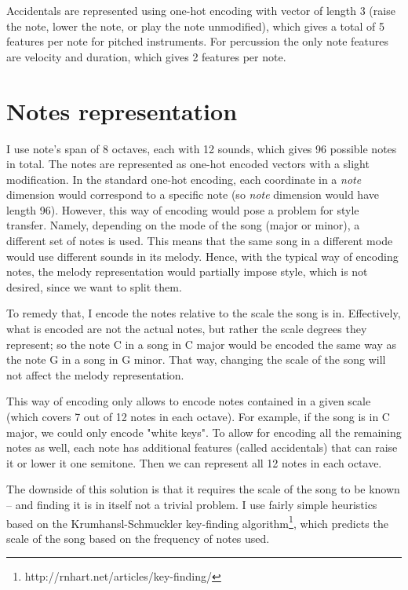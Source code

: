 \documentclass[en]{pracamgr}
\begin{document}
Accidentals are represented using one-hot encoding with vector of length 3 (raise the note, lower the note, or play the note unmodified), which gives a total of 5 features per note for pitched instruments.
For percussion the only note features are velocity and duration, which gives 2 features per note.

\section{Notes representation}

I use note's span of 8 octaves, each with 12 sounds, which gives 96 possible notes in total.
The notes are represented as one-hot encoded vectors with a slight modification.
In the standard one-hot encoding, each coordinate in a \emph{note} dimension would correspond to a specific note (so \emph{note} dimension would have length 96).
However, this way of encoding would pose a problem for style transfer.
Namely, depending on the mode of the song (major or minor), a different set of notes is used.
This means that the same song in a different mode would use different sounds in its melody.
Hence, with the typical way of encoding notes, the melody representation would partially impose style, which is not desired, since we want to split them.

To remedy that, I encode the notes relative to the scale the song is in.
Effectively, what is encoded are not the actual notes, but rather the scale degrees they represent; so the note C in a song in C major would be encoded the same way as the note G in a song in G minor.
That way, changing the scale of the song will not affect the melody representation.

This way of encoding only allows to encode notes contained in a given scale (which covers 7 out of 12 notes in each octave).
For example, if the song is in C major, we could only encode "white keys".
To allow for encoding all the remaining notes as well, each note has additional features (called accidentals) that can raise it or lower it one semitone.
Then we can represent all 12 notes in each octave.

The downside of this solution is that it requires the scale of the song to be known -- and finding it is in itself not a trivial problem.
I use fairly simple heuristics based on the Krumhansl-Schmuckler key-finding algorithm\footnote{http://rnhart.net/articles/key-finding/}, which predicts the scale of the song based on the frequency of notes used.
\end{document}
